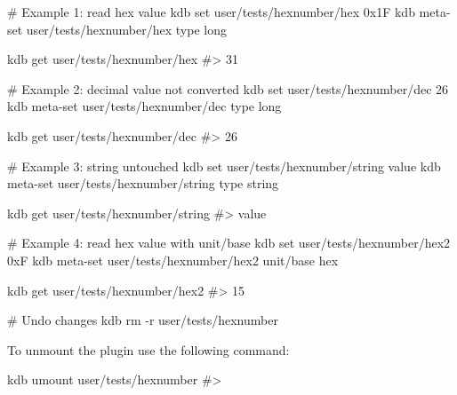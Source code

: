 \begin{DoxyCode}
# Example 1: read hex value
kdb set user/tests/hexnumber/hex 0x1F
kdb meta-set user/tests/hexnumber/hex type long

kdb get user/tests/hexnumber/hex
#> 31

# Example 2: decimal value not converted
kdb set user/tests/hexnumber/dec 26
kdb meta-set user/tests/hexnumber/dec type long

kdb get user/tests/hexnumber/dec
#> 26

# Example 3: string untouched
kdb set user/tests/hexnumber/string value
kdb meta-set user/tests/hexnumber/string type string

kdb get user/tests/hexnumber/string
#> value

# Example 4: read hex value with unit/base
kdb set user/tests/hexnumber/hex2 0xF
kdb meta-set user/tests/hexnumber/hex2 unit/base hex

kdb get user/tests/hexnumber/hex2
#> 15

# Undo changes
kdb rm -r user/tests/hexnumber
\end{DoxyCode}



\begin{DoxyItemize}
\item To unmount the plugin use the following command\+: 
\begin{DoxyCode}
kdb umount user/tests/hexnumber
#>
\end{DoxyCode}
 
\end{DoxyItemize}